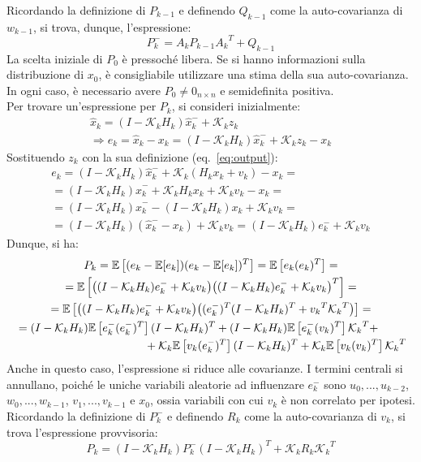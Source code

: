 \documentclass[12pt,a4paper,openright,twoside]{book}
\begin{document}
Ricordando la definizione di $P_{k-1}$ e definendo $Q_{k-1}$ come la auto-covarianza di $w_{k-1}$, si trova, dunque, l'espressione:
$$P_k^-=A_kP_{k-1}{A_k}^T+Q_{k-1}$$
La scelta iniziale di $P_0$ è pressoché libera. Se si hanno informazioni sulla distribuzione di $x_0$, è consigliabile utilizzare una stima della sua auto-covarianza. In ogni caso, è necessario avere $P_0\neq 0_{n\times n}$ e semidefinita positiva. \\

Per trovare un'espressione per $P_k$, si consideri inizialmente:
\begin{gather*}
\hat{x}_k=(I-\mathcal{K}_kH_k)\hat{x}_k^-+\mathcal{K}_kz_k \\
\Rightarrow e_k=\hat{x}_k-x_k=(I-\mathcal{K}_kH_k)\hat{x}_k^-+\mathcal{K}_kz_k-x_k
\end{gather*}
Sostituendo $z_k$ con la sua definizione (eq.~\ref{eq:output}):
\begin{gather*}
e_k=(I-\mathcal{K}_kH_k)\hat{x}_k^-+\mathcal{K}_k(H_kx_k+v_k)-x_k= \\
=(I-\mathcal{K}_kH_k)\hat{x}_k^-+\mathcal{K}_kH_kx_k+\mathcal{K}_kv_k-x_k= \\
=(I-\mathcal{K}_kH_k)\hat{x}_k^--(I-\mathcal{K}_kH_k)x_k+\mathcal{K}_kv_k= \\
=(I-\mathcal{K}_kH_k)(\hat{x}_k^--x_k)+\mathcal{K}_kv_k=(I-\mathcal{K}_kH_k)e_k^-+\mathcal{K}_kv_k
\end{gather*}
Dunque, si ha:
\begin{gather*}
P_k=\mathbb{E}\left[(e_k-\mathbb{E}[e_k])(e_k-\mathbb{E}[e_k])^T\right]=\mathbb{E}\left[e_k(e_k)^T\right]= \\
=\mathbb{E}\left[\bigl((I-\mathcal{K}_kH_k)e_k^-+\mathcal{K}_kv_k\bigr)\bigl((I-\mathcal{K}_kH_k)e_k^-+\mathcal{K}_kv_k\bigr)^T\right]= \\
=\mathbb{E}\left[\bigl((I-\mathcal{K}_kH_k)e_k^-+\mathcal{K}_kv_k\bigr)\bigl((e_k^-)^T(I-\mathcal{K}_kH_k)^T+{v_k}^T{\mathcal{K}_k}^T\bigr)\right]= \\
\begin{multlined}[\textwidth]
=(I-\mathcal{K}_kH_k)\mathbb{E}\left[e_k^-(e_k^-)^T\right](I-\mathcal{K}_kH_k)^T+(I-\mathcal{K}_kH_k)\mathbb{E}\left[e_k^-(v_k)^T\right]{\mathcal{K}_k}^T+ \\
+\mathcal{K}_k\mathbb{E}\left[v_k(e_k^-)^T\right](I-\mathcal{K}_kH_k)^T+\mathcal{K}_k\mathbb{E}\left[v_k(v_k)^T\right]{\mathcal{K}_k}^T
\end{multlined}
\end{gather*}
Anche in questo caso, l'espressione si riduce alle covarianze. I termini centrali si annullano, poiché le uniche variabili aleatorie ad influenzare $e_k^-$ sono $u_0,...,u_{k-2}$, $w_0,...,w_{k-1}$, $v_1,...,v_{k-1}$ e $x_0$, ossia variabili con cui $v_k$ è non correlato per ipotesi. \\
Ricordando la definizione di $P_k^-$ e definendo $R_k$ come la auto-covarianza di $v_k$, si trova l'espressione provvisoria:
$$P_k=(I-\mathcal{K}_kH_k)P_k^-(I-\mathcal{K}_kH_k)^T+\mathcal{K}_kR_k{\mathcal{K}_k}^T$$
\end{document}
